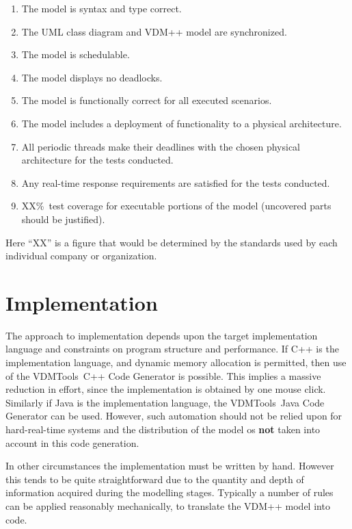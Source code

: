 \documentclass{overturerepchap}
\newcommand{\VDMTools}{VDMTools}
\begin{document}
\begin{enumerate}
\item The model is syntax and type correct.
\item The UML class diagram and VDM++ model are synchronized.
\item The model is schedulable.
\item The model displays no deadlocks.
\item The model is functionally correct for all executed scenarios.
\item The model includes a deployment of functionality to a physical
      architecture.
\item All periodic threads make their deadlines with the chosen physical
      architecture for the tests conducted.
\item Any real-time response requirements are satisfied for the tests
conducted.
\item XX\%\ test coverage for executable portions of the model
(uncovered parts should be justified).
\end{enumerate}

Here ``XX'' is a figure that would be determined by the standards used
by each individual company or organization.

\section{Implementation}

The approach to implementation depends upon the target implementation
language and constraints on program structure and performance. If C++
is the implementation language, and dynamic memory allocation is
permitted, then use of the \VDMTools\ C++ Code Generator is possible. This
implies a massive reduction in effort, since the implementation is
obtained by one mouse click. Similarly if Java is the implementation
language, the \VDMTools\ Java Code Generator can be used. However, such
automation should not be relied upon for hard-real-time systems and
the distribution of the model os {\bf not} taken into account in this
code generation.

In other circumstances the implementation must be written by
hand. However this tends to be quite straightforward due to the
quantity and depth of information acquired during the modelling
stages. Typically a number of rules can be applied reasonably
mechanically, to translate the VDM++ model into code. 
\end{document}
